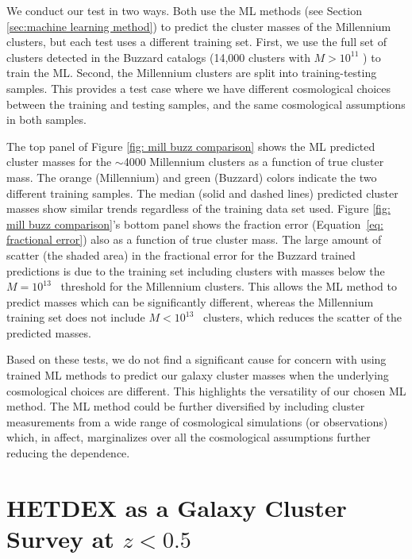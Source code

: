 \documentclass[fleqn,usenatbib]{mnras}
\begin{document}
We conduct our test in two ways. Both use the ML methods (see Section \ref{sec:machine learning method}) to predict the cluster masses of the Millennium clusters, but each test uses a different training set. First, we use the full set of clusters detected in the Buzzard catalogs (14,000 clusters with $M > 10^{11}$ \msol) to train the ML. Second, the Millennium clusters are split into training-testing samples. This provides a test case where we have different cosmological choices between the training and testing samples, and the same cosmological assumptions in both samples. 

The top panel of Figure \ref{fig: mill buzz comparison} shows the ML predicted cluster masses for the $\sim$4000 Millennium clusters as a function of true cluster mass. The orange (Millennium) and green (Buzzard) colors indicate the two different training samples. The median (solid and dashed lines) predicted cluster masses show similar trends regardless of the training data set used. Figure \ref{fig: mill buzz comparison}'s bottom panel shows the fraction error (Equation~\ref{eq: fractional error}) also as a function of true cluster mass. The large amount of scatter (the shaded area) in the fractional error for the Buzzard trained predictions is due to the training set including clusters with masses below the $M = 10^{13}$ \Msol\ threshold for the Millennium clusters. This allows the ML method to predict masses which can be significantly different, whereas the Millennium training set does not include $M < 10^{13}$ \Msol\ clusters, which reduces the scatter of the predicted masses.

Based on these tests, we do not find a significant cause for concern with using trained ML methods to predict our galaxy cluster masses when the underlying cosmological choices are different. This highlights the versatility of our chosen ML method. The ML method could be further diversified by including cluster measurements from a wide range of cosmological simulations (or observations) which, in affect, marginalizes over all the cosmological assumptions further reducing the dependence.

\section{HETDEX as a Galaxy Cluster Survey at $z < 0.5$}\label{sec:discussion}
\end{document}
